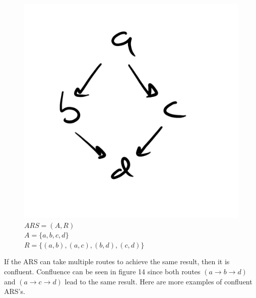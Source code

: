 \documentclass{article}
\begin{document}
\begin{figure}[H]
  \centering
  \includegraphics[scale=0.06]{gen14}
  \caption[] {
    $ARS = (A, R)$
    \\ $A=\{a, b, c, d\}$
    \\ $R=\{(a, b), (a, c), (b, d), (c, d)\}$
    \endtabular}
\end{figure}

\medskip\noindent
If the ARS can take multiple routes to achieve the same result, then it is confluent. Confluence can be seen in figure 14 since both routes $(a \rightarrow b \rightarrow d)$ and $(a \rightarrow c \rightarrow d)$ lead to the same result. Here are more examples of confluent ARS's.
\end{document}
